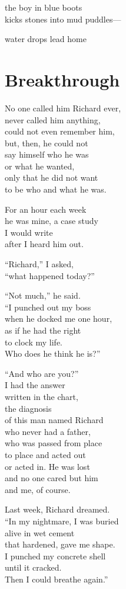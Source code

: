 \documentclass[twoside,10pt]{book}
\begin{document}
the boy in blue boots\\
kicks stones into mud puddles---

water drops lead home


\clearpage
\section{Breakthrough}

No one called him Richard ever,\\
never called him anything,\\
could not even remember him,\\
but, then, he could not\\
say himself who he was\\
or what he wanted,\\
only that he did not want\\
to be who and what he was.

For an hour each week\\
he was mine, a case study\\
I would write\\
after I heard him out.

``Richard,'' I asked,\\
``what happened today?''

``Not much,'' he said.\\
``I punched out my boss\\
when he docked me one hour,\\
as if he had the right\\
to clock my life.\\
Who does he think he is?''

``And who are you?''\\
I had the answer\\
written in the chart,\\
the diagnosis\\
of this man named Richard\\
who never had a father,\\
who was passed from place\\
to place and acted out\\
or acted in. He was lost\\
and no one cared but him\\
and me, of course.

Last week, Richard dreamed.\\
``In my nightmare, I was buried\\
alive in wet cement\\
that hardened, gave me shape.\\
I punched my concrete shell\\
until it cracked.\\
Then I could breathe again.''
\end{document}
